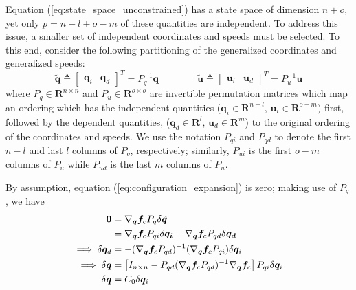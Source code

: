 \documentclass[smallcondensed,final]{svjour3}                     %
\begin{document}
Equation (\ref{eq:state_space_unconstrained}) has a state space of dimension $n
+ o$, yet only $p = n - l + o - m$ of these quantities are independent.  To
address this issue, a smaller set of independent coordinates and speeds must be
selected. To this end, consider the following partitioning of the generalized
coordinates and generalized speeds:
\begin{equation*}
  \tilde{\bm{q}} \triangleq \left[\begin{array}{cc}\bm{q}_{i} &
      \bm{q}_{d}\end{array}\right]^{T} =  P_{q}^{-1} \bm{q}
      \qquad\qquad
  \tilde{\bm{u}} \triangleq \left[\begin{array}{cc}\bm{u}_{i} &
      \bm{u}_{d}\end{array}\right]^{T} =  P_{u}^{-1} \bm{u}
\end{equation*}
where $P_q \in \mathbf{R}^{n \times n}$ and $P_u \in \mathbf{R}^{o \times o}$
are invertible permutation matrices which map an ordering which has the
independent quantities ($\bm{q}_{i}\in\mathbf{R}^{n-l},\,
\bm{u}_{i}\in\mathbf{R}^{o-m})$ first, followed by the dependent quantities,
($\bm{q}_{d}\in\mathbf{R}^{l},\, \bm{u}_{d}\in\mathbf{R}^{m}$) to the original
ordering of the coordinates and speeds.  We use the notation $P_{qi}$ and
$P_{qd}$ to denote the first $n-l$ and last $l$ columns of $P_q$, respectively;
similarly, $P_{ui}$ is the first $o-m$ columns of $P_{u}$ while $P_{ud}$ is the
last $m$ columns of $P_u$.

By assumption, equation
(\ref{eq:configuration_expansion}) is zero; making use of $P_q$, we have
\begin{align}
  \bm{0} &= \nabla_{\bm{q}}\bm{f}_{c} P_{q} \delta \bm{\tilde{q}} \notag \\
   &= \nabla_{\bm{q}}\bm{f}_{c} P_{qi} \delta \bm{q_i} +
  \nabla_{\bm{q}}\bm{f}_{c} P_{qd} \delta \bm{q_d}\notag\\
  \implies \delta \bm{q}_d &= -(\nabla_{\bm{q}}\bm{f}_{c} P_{qd})^{-1}
  (\nabla_{\bm{q}}\bm{f}_{c} P_{qi}) \delta \bm{q}_i \notag\\
  \implies \delta \bm{q} &= \left[ I_{n \times n} - P_{qd}(\nabla_{\bm{q}}
    \bm{f}_{c} P_{qd})^{-1} \nabla_{\bm{q}} \bm{f}_{c} \right] P_{qi} \delta
    \bm{q}_i\\
  \label{eq:delta_q}
  \delta \bm{q} &= C_0 \delta \bm{q}_i
\end{align}
\end{document}
